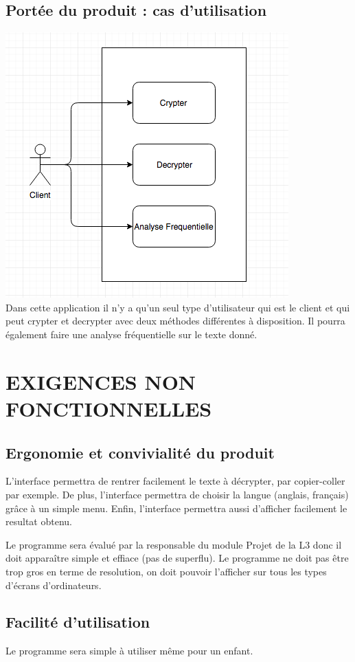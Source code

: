 \documentclass[a4]{article}
\begin{document}
		\subsection{Portée du produit : cas d’utilisation}
				\includegraphics[scale=0.35]{dia.png} \\
				Dans cette application il n'y a qu'un seul type d'utilisateur qui est le client 
				et qui peut crypter et decrypter avec deux méthodes différentes à disposition.
				Il pourra également faire une analyse fréquentielle sur le texte donné.
	\section{EXIGENCES NON FONCTIONNELLES}
		\subsection{Ergonomie et convivialité du produit}
				L'interface permettra de rentrer facilement le texte à décrypter, par copier-coller par exemple.
				De plus, l'interface permettra de choisir la langue (anglais, français) grâce à un simple menu.
				Enfin, l'interface permettra aussi d'afficher facilement le resultat obtenu.

				Le programme sera évalué par la responsable du module Projet de la L3 donc il doit apparaître simple et effiace (pas de superflu).
				Le programme ne doit pas être trop gros en terme de resolution, on doit pouvoir l'afficher sur 	tous les types d'écrans d'ordinateurs.

		\subsection{Facilité d’utilisation}
				Le programme sera simple à utiliser même pour un enfant.
\end{document}
